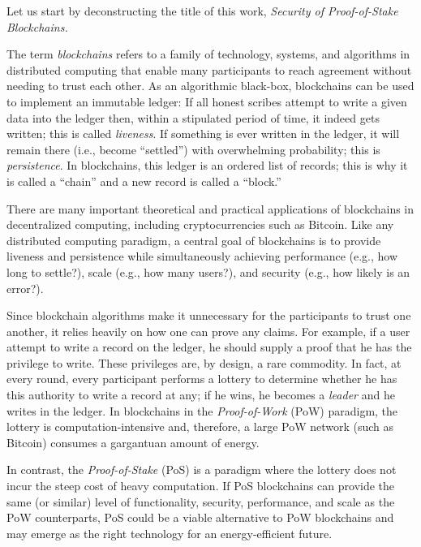 Let us start by deconstructing the title of this work, 
\emph{Security of Proof-of-Stake Blockchains.}

The term \emph{blockchains} refers to a family of technology, systems, and algorithms 
in distributed computing 
that enable 
many participants to reach agreement without needing to trust each other. 
As an algorithmic black-box, blockchains can be used to implement an immutable ledger: 
If all honest scribes attempt to write a given data into the ledger then, within a stipulated period of time, 
it indeed gets written; this is called \emph{liveness}. 
If something is ever written in the ledger, it will remain there (i.e., become ``settled'') with overwhelming probability; 
this is \emph{persistence}. 
In blockchains, this ledger is an ordered list of records; 
this is why it is called a ``chain'' and a new record is called a ``block.''

There are many important theoretical and practical applications of blockchains 
in decentralized computing, including cryptocurrencies such as Bitcoin.
Like any distributed computing paradigm, 
a central goal of blockchains is to provide liveness and persistence 
while simultaneously achieving 
performance (e.g., how long to settle?), 
scale (e.g., how many users?), and 
security (e.g., how likely is an error?). 

Since blockchain algorithms make it unnecessary 
for the participants to trust one another, 
it relies heavily on how one can prove any claims. 
For example, if a user attempt to write a record on the ledger, 
he should supply a proof that he has the privilege to write. 
These privileges are, by design, a rare commodity. 
In fact, 
at every round, 
every participant performs a lottery to determine 
whether he has this authority to write a record at any; 
if he wins, he becomes a \emph{leader} and he writes in the ledger. 
In blockchains in the \emph{Proof-of-Work} (PoW) paradigm, 
the lottery is computation-intensive and, 
therefore, a large PoW network (such as Bitcoin) consumes a gargantuan amount of energy.

In contrast, the \emph{Proof-of-Stake} (PoS) is a paradigm where 
the lottery does not incur the steep cost of heavy computation. 
If PoS blockchains can provide the same (or similar) level of 
functionality, security, performance, and scale as the PoW counterparts, 
PoS could be a viable alternative to PoW blockchains 
and may emerge as the right technology for an energy-efficient future.


